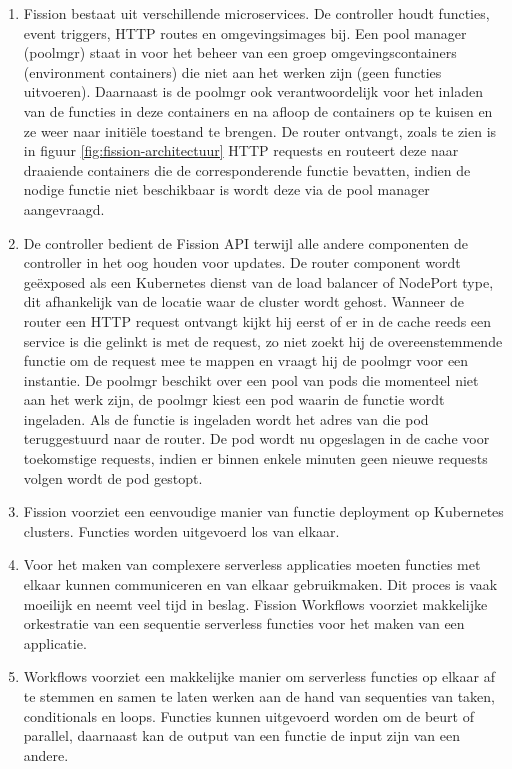\begin{enumerate}
    \item Fission bestaat uit verschillende microservices. De controller houdt functies, event triggers, HTTP routes en omgevingsimages bij. Een pool manager (poolmgr) staat in voor het beheer van een groep omgevingscontainers (environment containers) die niet aan het werken zijn (geen functies uitvoeren). Daarnaast is de poolmgr ook verantwoordelijk voor het inladen van de functies in deze containers en na afloop de containers op te kuisen en ze weer naar initiële toestand te brengen. De router ontvangt, zoals te zien is in figuur \ref{fig:fission-architectuur} HTTP requests en routeert deze naar draaiende containers die de corresponderende functie bevatten, indien de nodige functie niet beschikbaar is wordt deze via de pool manager aangevraagd. \autocite{Chemitiganti2018}
    \item De controller bedient de Fission API terwijl alle andere componenten de controller in het oog houden voor updates. De router component wordt geëxposed als een Kubernetes dienst van de load balancer of NodePort type, dit afhankelijk van de locatie waar de cluster wordt gehost. Wanneer de router een HTTP request ontvangt kijkt hij eerst of er in de cache reeds een service is die gelinkt is met de request, zo niet zoekt hij de overeenstemmende functie om de request mee te mappen en vraagt hij de poolmgr voor een instantie. De poolmgr beschikt over een pool van pods die momenteel niet aan het werk zijn, de poolmgr kiest een pod waarin de functie wordt ingeladen. Als de functie is ingeladen wordt het adres van die pod teruggestuurd naar de router. De pod wordt nu opgeslagen in de cache voor toekomstige requests, indien er binnen enkele minuten geen nieuwe requests volgen wordt de pod gestopt.  \autocite{Chemitiganti2018}
    \item Fission voorziet een eenvoudige manier van functie deployment op Kubernetes clusters. Functies worden uitgevoerd los van elkaar.
    \item Voor het maken van complexere serverless applicaties moeten functies met elkaar kunnen communiceren en van elkaar gebruikmaken. Dit proces is vaak moeilijk en neemt veel tijd in beslag. Fission Workflows voorziet makkelijke orkestratie van een sequentie serverless functies voor het maken van een applicatie. \autocite{Chemitiganti2018}
    \item Workflows voorziet een makkelijke manier om serverless functies op elkaar af te stemmen en samen te laten werken aan de hand van sequenties van taken, conditionals en loops. Functies kunnen uitgevoerd worden om de beurt of parallel, daarnaast kan de output van een functie de input zijn van een andere. \autocite{Chemitiganti2018}

\end{enumerate}

